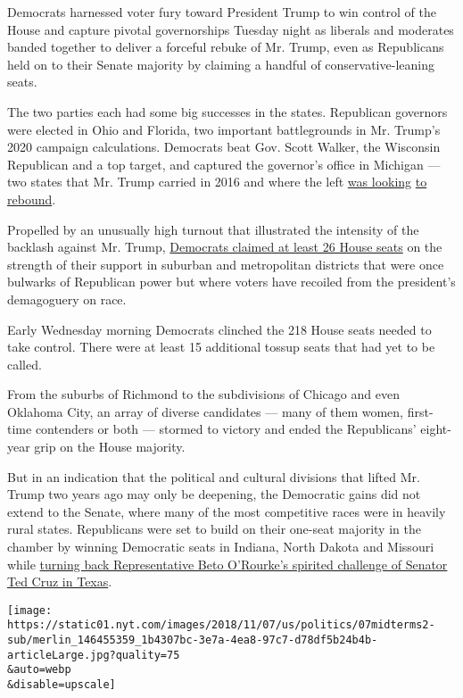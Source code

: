 Democrats harnessed voter fury toward President Trump to win control of
the House and capture pivotal governorships Tuesday night as liberals
and moderates banded together to deliver a forceful rebuke of Mr. Trump,
even as Republicans held on to their Senate majority by claiming a
handful of conservative-leaning seats.

The two parties each had some big successes in the states. Republican
governors were elected in Ohio and Florida, two important battlegrounds
in Mr. Trump's 2020 campaign calculations. Democrats beat Gov. Scott
Walker, the Wisconsin Republican and a top target, and captured the
governor's office in Michigan --- two states that Mr. Trump carried in
2016 and where the left
\href{https://www.nytimes.com/2018/10/14/us/politics/wisconsin-scott-walker-tony-evers.html}{was
looking}
\href{https://www.nytimes.com/2018/09/16/us/politics/michigan-democrats-labor-unions-trump.html}{to
rebound}.

Propelled by an unusually high turnout that illustrated the intensity of
the backlash against Mr. Trump,
\href{https://www.nytimes.com/2018/11/06/us/politics/election-day.html}{Democrats
claimed at least 26 House seats} on the strength of their support in
suburban and metropolitan districts that were once bulwarks of
Republican power but where voters have recoiled from the president's
demagoguery on race.

Early Wednesday morning Democrats clinched the 218 House seats needed to
take control. There were at least 15 additional tossup seats that had
yet to be called.

From the suburbs of Richmond to the subdivisions of Chicago and even
Oklahoma City, an array of diverse candidates --- many of them women,
first-time contenders or both --- stormed to victory and ended the
Republicans' eight-year grip on the House majority.

But in an indication that the political and cultural divisions that
lifted Mr. Trump two years ago may only be deepening, the Democratic
gains did not extend to the Senate, where many of the most competitive
races were in heavily rural states. Republicans were set to build on
their one-seat majority in the chamber by winning Democratic seats in
Indiana, North Dakota and Missouri while
\href{https://www.nytimes.com/2018/11/06/us/ted-cruz-wins-texas-senate-race.html}{turning
back Representative Beto O'Rourke's spirited challenge of Senator Ted
Cruz in Texas}.

\texttt{[image: https://static01.nyt.com/images/2018/11/07/us/politics/07midterms2-sub/merlin\_146455359\_1b4307bc-3e7a-4ea8-97c7-d78df5b24b4b-articleLarge.jpg?quality=75\\\&auto=webp\\\&disable=upscale]}

